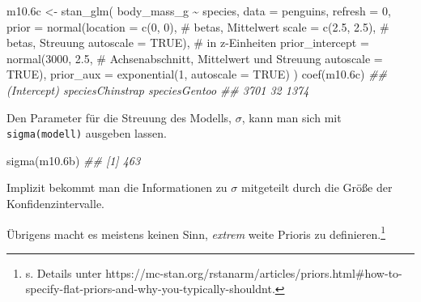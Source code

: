 \documentclass[
  ngerman,
  letterpaper,
  twoside,
  open=any]{scrbook}
\newenvironment{Shaded}{\begin{snugshade}}{\end{snugshade}}
\newcommand{\AttributeTok}[1]{\textcolor[rgb]{0.40,0.45,0.13}{#1}}
\newcommand{\CommentTok}[1]{\textcolor[rgb]{0.37,0.37,0.37}{#1}}
\newcommand{\ConstantTok}[1]{\textcolor[rgb]{0.56,0.35,0.01}{#1}}
\newcommand{\DecValTok}[1]{\textcolor[rgb]{0.68,0.00,0.00}{#1}}
\newcommand{\DocumentationTok}[1]{\textcolor[rgb]{0.37,0.37,0.37}{\textit{#1}}}
\newcommand{\FloatTok}[1]{\textcolor[rgb]{0.68,0.00,0.00}{#1}}
\newcommand{\FunctionTok}[1]{\textcolor[rgb]{0.28,0.35,0.67}{#1}}
\newcommand{\NormalTok}[1]{\textcolor[rgb]{0.00,0.23,0.31}{#1}}
\newcommand{\OtherTok}[1]{\textcolor[rgb]{0.00,0.23,0.31}{#1}}
\newcommand{\SpecialCharTok}[1]{\textcolor[rgb]{0.37,0.37,0.37}{#1}}
\theoremstyle{definition}
\theoremstyle{plain}
\theoremstyle{definition}
\theoremstyle{definition}
\theoremstyle{definition}
\theoremstyle{definition}
\theoremstyle{remark}
\begin{document}
\begin{Shaded}
\begin{Highlighting}[]
\NormalTok{m10}\FloatTok{.6}\NormalTok{c }\OtherTok{\textless{}{-}} \FunctionTok{stan\_glm}\NormalTok{(}
\NormalTok{  body\_mass\_g }\SpecialCharTok{\textasciitilde{}}\NormalTok{ species, }
  \AttributeTok{data =}\NormalTok{ penguins, }
  \AttributeTok{refresh =} \DecValTok{0}\NormalTok{,}
  \AttributeTok{prior =} \FunctionTok{normal}\NormalTok{(}\AttributeTok{location =} \FunctionTok{c}\NormalTok{(}\DecValTok{0}\NormalTok{, }\DecValTok{0}\NormalTok{),  }\CommentTok{\# betas, Mittelwert}
                 \AttributeTok{scale =} \FunctionTok{c}\NormalTok{(}\FloatTok{2.5}\NormalTok{, }\FloatTok{2.5}\NormalTok{),  }\CommentTok{\# betas, Streuung}
                 \AttributeTok{autoscale =} \ConstantTok{TRUE}\NormalTok{),  }\CommentTok{\# in z{-}Einheiten}
  \AttributeTok{prior\_intercept =} \FunctionTok{normal}\NormalTok{(}\DecValTok{3000}\NormalTok{, }\FloatTok{2.5}\NormalTok{,   }\CommentTok{\# Achsenabschnitt, Mittelwert und Streuung}
                           \AttributeTok{autoscale =} \ConstantTok{TRUE}\NormalTok{), }
  \AttributeTok{prior\_aux =} \FunctionTok{exponential}\NormalTok{(}\DecValTok{1}\NormalTok{, }\AttributeTok{autoscale =} \ConstantTok{TRUE}\NormalTok{)}
\NormalTok{)}
\FunctionTok{coef}\NormalTok{(m10}\FloatTok{.6}\NormalTok{c)}
\DocumentationTok{\#\#      (Intercept) speciesChinstrap    speciesGentoo }
\DocumentationTok{\#\#             3701               32             1374}
\end{Highlighting}
\end{Shaded}

Den Parameter für die Streuung des Modells, \(\sigma\), kann man sich
mit \texttt{sigma(modell)} ausgeben lassen.

\begin{Shaded}
\begin{Highlighting}[]
\FunctionTok{sigma}\NormalTok{(m10}\FloatTok{.6}\NormalTok{b)}
\DocumentationTok{\#\# [1] 463}
\end{Highlighting}
\end{Shaded}

Implizit bekommt man die Informationen zu \(\sigma\) mitgeteilt durch
die Größe der Konfidenzintervalle.

Übrigens macht es meistens keinen Sinn, \emph{extrem} weite Prioris zu
definieren.\footnote{s. Details unter
  https://mc-stan.org/rstanarm/articles/priors.html\#how-to-specify-flat-priors-and-why-you-typically-shouldnt.}
\end{document}
